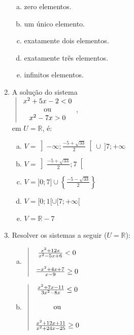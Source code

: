 \documentclass[a4paper,14pt]{article}
\begin{document}
\begin{multicols}{2}
\begin{enumerate}
			\begin{enumerate}[a)]
				\item zero elementos.
				\item um único elemento.
				\item exatamente dois elementos.
				\item exatamente três elementos.
				\item infinitos elementos.
			\end{enumerate}
			\item A solução do sistema \\ 
			$
			\begin{array}{rcl|c}
			 \vline & x^2 + 5x - 2 < 0\\
			 \vline & \text{ou} \\
			 \vline & x^2 - 7x > 0 \\
			\end{array}
			$, \\ em $U = \mathbb{R}$, é:
			\begin{enumerate}[a)]
				\item $V = \left]-\infty; \frac{-5+\sqrt{33}}{2} \right[ \cup~]7;+\infty$
				\item $V = \left] \frac{-5 + \sqrt{33}}{2}; 7 \right[$
				\item $V = ]0; 7] \cup \left\{\frac{-5-\sqrt{33}}{2} \right\}$
				\item $V = [0; 1[ \cup [7; +\infty[$
				\item $V = \mathbb{R} - 7$\newpage
			\end{enumerate}
			\item Resolver os sistemas a seguir ($U = \mathbb{R}$):
			\begin{enumerate}[a)]
				\item $
				\begin{array}{rcl|c}
				 \vline & \frac{x^2 + 12x}{x^2 - 5x + 6} < 0 \\
				 \vline & \\
				 \vline & \frac{-x^2 + 4x + 7}{x - 9} \geq 0  \\
				\end{array}
				$
				\newpage
				\item $ 
				\begin{array}{rcl|c}
				 \vline & \frac{x^2 + 7x - 11}{3x^2 - 8x} \leq 0 \\
				 \vline & \\
				 \vline & \text{ou}\\
				 \vline & \\
				 \vline & \frac{x^2 + 12x + 11}{x^2 +24x - 25} \geq 0  \\
				\end{array}
				$\newpage
			\end{enumerate}
		\end{enumerate}
	\end{multicols}
\end{document}
